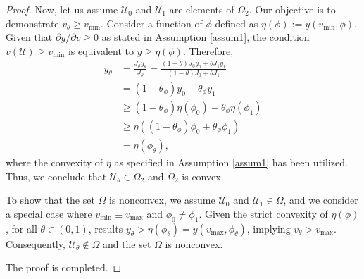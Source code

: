 \documentclass[times,final,11pt]{elsarticle}
\numberwithin{equation}{section}
\theoremstyle{definition}
\theoremstyle{remark}
\begin{document}
\begin{proof}
	Now, let us assume $\boldsymbol{\mathcal{U}}_0$ and $\boldsymbol{\mathcal{U}}_1$ are elements of $\Omega_2$. Our objective is to demonstrate $v_\theta \geq v_{\min}$. Consider a function of $\phi$ defined as $\eta(\phi) := y(v_{\min}, \phi)$. Given that $\partial y / \partial v \geq 0$ as stated in Assumption \ref{assum1}, the condition $v(\boldsymbol{\mathcal{U}}) \geq v_{\min}$ is equivalent to $y \geq \eta(\phi)$. Therefore,
	\begin{equation*}
		\begin{aligned}
			y_\theta &= \frac{J_\theta y_\theta}{J_\theta} = \frac{(1 - \theta)J_0y_0 + \theta J_1y_1}{(1 - \theta)J_0+ \theta J_1}\\ 
			&= (1 - \theta_\phi) y_0 + \theta_\phi y_1 \\
			&\geq (1 - \theta_\phi) \eta(\phi_0) + \theta_\phi \eta(\phi_1) \\
			&\geq \eta((1 - \theta_\phi) \phi_0 + \theta_\phi \phi_1)\\
			& = \eta(\phi_\theta),
		\end{aligned}
	\end{equation*}
	where the convexity of $\eta$ as specified in Assumption \ref{assum1} has been utilized. Thus, we conclude that $\boldsymbol{\mathcal{U}}_\theta \in \Omega_2$ and $\Omega_2$ is convex.

	To show that the set $\Omega$ is nonconvex, we assume $\boldsymbol{\mathcal{U}}_0$ and $\boldsymbol{\mathcal{U}}_1 \in \Omega$, and we consider a special case where $v_{\min} \equiv v_{\max}$ and $\phi_0 \neq \phi_1$. Given the strict convexity of $\eta(\phi)$, for all $\theta \in (0, 1)$, results $y_\theta > \eta(\phi_\theta) = y(v_{\max}, \phi_\theta)$, implying $v_{\theta} > v_{\max}$. Consequently, $\boldsymbol{\mathcal{U}}_\theta \notin \Omega$ and the set $\Omega$ is nonconvex.

	The proof is completed.
\end{proof}
\end{document}
